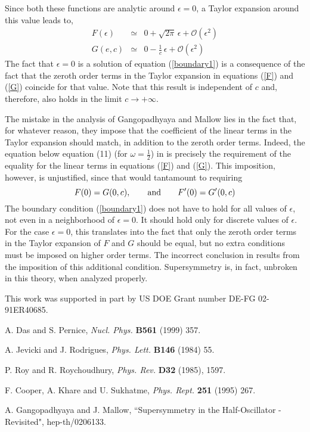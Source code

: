 \documentclass[a4paper,amssymb,aps]{revtex4}
\begin{document}
Since both these functions are analytic around $\epsilon = 0$, a
Taylor  expansion around this value leads to,
\begin{eqnarray}
F(\epsilon) & \simeq & 0 + \sqrt{2 \pi} \, \epsilon +
{\mathcal{O}} (\epsilon^2) \label{F}\\
G(e,c)& \simeq & 0 - \frac{1}{c} \, \epsilon + {\mathcal{O}}
(\epsilon^2)\label{G}
\end{eqnarray}
The fact that $\epsilon = 0$ is a solution of equation
(\ref{boundary1})  is a consequence of 
the fact that the zeroth order terms in the Taylor expansion in
equations (\ref{F}) and (\ref{G}) coincide for that value.  Note that
this  result is independent of $c$ and, therefore, also holds in the limit $c
\rightarrow + \infty$.

The mistake in the analysis of Gangopadhyaya and Mallow lies in the
fact that,  for
whatever reason, they impose that the 
coefficient of the linear terms in the Taylor expansion should match, in
addition  to the zeroth order terms. Indeed, 
the equation below equation (11) (for $\omega = \frac{1}{2}$) in \cite{asim} is
precisely the requirement of the equality for the linear terms in
equations (\ref{F}) 
and (\ref{G}). This imposition, however, is unjustified, since that
would tantamount to requiring
\begin{equation}
F(0)=G(0,c),\qquad {\rm and}\qquad  F'(0)=G'(0,c)
\end{equation}
The boundary condition (\ref{boundary1}) does not have to hold for all
values of 
$\epsilon$, not even in a neighborhood of $\epsilon=0$. It should 
hold only  for discrete values of
$\epsilon$.  For the case $\epsilon=0$, this translates into the fact
that only the
zeroth order terms in the Taylor expansion of $F$ and $G$ should
be equal, but no extra conditions must be imposed on higher order
terms. The incorrect conclusion in \cite{asim} results from the
imposition of this additional condition. Supersymmetry is, in fact,
unbroken in this theory, when analyzed properly.
\vspace{1cm}


This work was supported in part by US DOE Grant number DE-FG 02-91ER40685.


\begin{thebibliography}{99}

 A. Das and S. Pernice, {\it Nucl. Phys.} {\bf B561} (1999) 357.

 A. Jevicki and J. Rodrigues, {\it Phys. Lett.} {\bf
B146} (1984) 55.

  P. Roy and R. Roychoudhury, {\it Phys. Rev.} {\bf D32} (1985),
1597.

 F. Cooper, A. Khare and U. Sukhatme, {\it
Phys. Rept.} {\bf 251} (1995) 267.

 A. Gangopadhyaya and J. Mallow, ``Supersymmetry in the
Half-Oscillator - Revisited", hep-th/0206133.


\end{thebibliography}  
\end{document}
